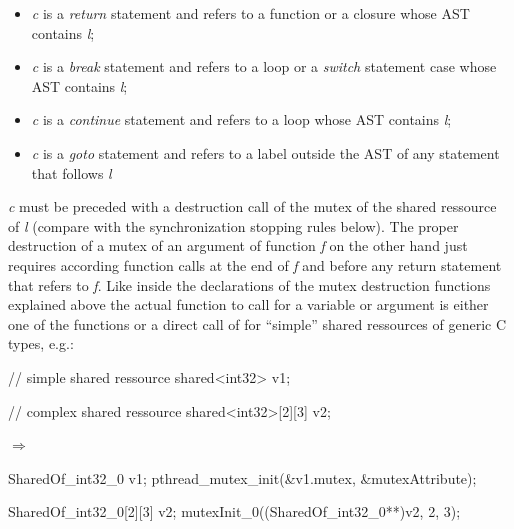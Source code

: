 \begin{itemize}
\item \textit{c} is a \textit{return} statement and refers to a function or a closure whose AST contains \textit{l};
\item \textit{c} is a \textit{break} statement and refers to a loop or a \textit{switch} statement case whose AST contains \textit{l};
\item \textit{c} is a \textit{continue} statement and refers to a loop whose AST contains \textit{l};
\item \textit{c} is a \textit{goto} statement and refers to a label outside the AST of any statement that follows \textit{l}
\end{itemize}
\textit{c} must be preceded with a destruction call of the mutex of the shared ressource of \textit{l} (compare with the synchronization stopping rules below). The proper destruction of a mutex of an argument of function \textit{f} on the other hand just requires according function calls at the end of \textit{f} and before any return statement that refers to \textit{f}. 
Like inside the declarations of the mutex destruction functions explained above  the actual function to call for a variable or argument is either one of the  functions or a direct call of  for ``simple'' shared ressources of generic C types, e.g.:
\begin{center}
\begin{minipage}{0.3\textwidth}
\begin{ccode}
// simple shared ressource
shared<int32> v1;

// complex shared ressource
shared<int32>[2][3] v2;
\end{ccode}
\end{minipage}
\qquad$\Longrightarrow$\qquad\qquad
\begin{minipage}{0.4\textwidth}
\begin{ccode}
SharedOf_int32_0 v1;
pthread_mutex_init(&v1.mutex, &mutexAttribute);

SharedOf_int32_0[2][3] v2;
mutexInit_0((SharedOf_int32_0**)v2, 2, 3);
\end{ccode}
\end{minipage}
\end{center}


